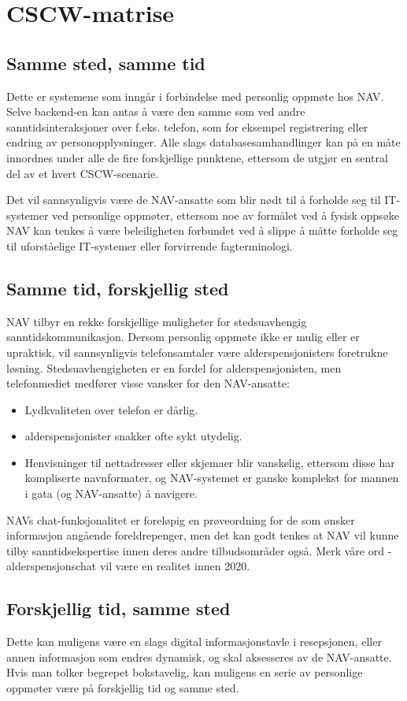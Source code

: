 \documentclass[informationsecurity]{gucmasterproject}
\begin{document}
\section{CSCW-matrise}
\subsection{Samme sted, samme tid}
Dette er systemene som inngår i forbindelse med personlig oppmøte hos NAV. Selve backend-en kan antas å være den samme som ved andre sanntidsinteraksjoner over f.eks. telefon, som for eksempel registrering eller endring av personopplysninger. Alle slags databasesamhandlinger kan på en måte innordnes under alle de fire forskjellige punktene, ettersom de utgjør en sentral del av et hvert CSCW-scenarie.

Det vil sannsynligvis være de NAV-ansatte som blir nødt til å forholde seg til IT-systemer ved personlige oppmøter, ettersom noe av formålet ved å fysisk oppsøke NAV kan tenkes å være beleiligheten forbundet ved å slippe å måtte forholde seg til uforståelige IT-systemer eller forvirrende fagterminologi.

\subsection{Samme tid, forskjellig sted}
NAV tilbyr en rekke forskjellige muligheter for stedsuavhengig sanntidskommunikasjon. Dersom personlig oppmøte ikke er mulig eller er upraktisk, vil sannsynligvis telefonsamtaler være alderspensjonisters foretrukne løsning. Stedsuavhengigheten er en fordel for alderspensjonisten, men telefonmediet medfører visse vansker for den NAV-ansatte:
\begin{itemize}
\item Lydkvaliteten over telefon er dårlig.
\item alderspensjonister snakker ofte sykt utydelig.
\item Henvisninger til nettadresser eller skjemaer blir vanskelig, ettersom disse har kompliserte navnformater, og NAV-systemet er ganske komplekst for mannen i gata (og NAV-ansatte) å navigere.
\end{itemize}

NAVs chat-funksjonalitet er foreløpig en prøveordning for de som ønsker informasjon angående foreldrepenger, men det kan godt tenkes at NAV vil kunne tilby sanntidsekspertise innen deres andre tilbudsområder også. Merk våre ord - alderspensjonschat vil være en realitet innen 2020.

\subsection{Forskjellig tid, samme sted}
Dette kan muligens være en slags digital informasjonstavle i resepsjonen, eller annen informasjon som endres dynamisk, og skal aksesseres av de NAV-ansatte. Hvis man tolker begrepet bokstavelig, kan muligens en serie av personlige oppmøter være på forskjellig tid og samme sted.
\end{document}
